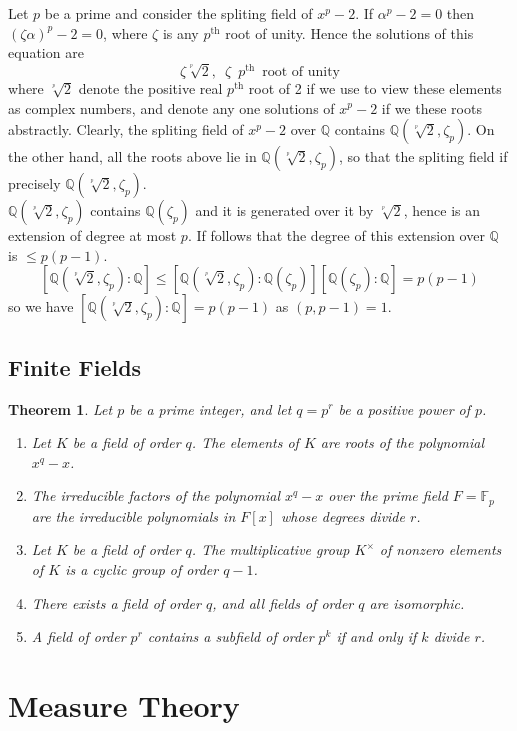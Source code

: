 \documentclass[answers, a4paper, 12pt]{exam}
\newtheorem{theorem}{Theorem}[section]
\newcommand{\Q}{\mathbb{Q}}
\begin{document}
Let $p$ be a prime and consider the spliting field of $x^p-2$. If ${\alpha}^p-2=0$ then $(\zeta\alpha)^p-2=0$, where $\zeta$ is any $p^{\text{th}}$ root of unity. Hence the solutions of this equation are $$\zeta \sqrt[^p]{2},\,\,\,\zeta\,\,\,p^{\text{th}}\,\,\,\text{root of unity}$$
where $\sqrt[^p]{2}$ denote the positive real $p^{\text{th}}$ root of 2 if we use to view these elements as complex numbers, and denote any one solutions of $x^p-2$ if we these roots abstractly. Clearly, the spliting field of $x^p-2$ over $\Q$ contains $\Q(\sqrt[^p]{2},\zeta_p)$. On the other hand, all the roots above lie in $\Q(\sqrt[^p]{2},\zeta_p)$, so that the spliting field if precisely $\Q(\sqrt[^p]{2},\zeta_p)$.\\
$\Q(\sqrt[^p]{2},\zeta_p)$ contains $\Q(\zeta_p)$ and it is generated over it by $\sqrt[^p]{2}$, hence is an extension of degree at most $p$. If follows that the degree of this extension over $\Q$ is $\leq p(p-1)$.
$$[\Q(\sqrt[^p]{2},\zeta_p):\Q]\leq[\Q(\sqrt[^p]{2},\zeta_p):\Q(\zeta_p)][\Q(\zeta_p):\Q]=p(p-1)$$
so we have $[\Q(\sqrt[^p]{2},\zeta_p):\Q]=p(p-1)$ as $(p,p-1)=1$.
\subsection{Finite Fields}
\begin{theorem}
    Let $p$ be a prime integer, and let $q=p^r$ be a positive power of $p$.
    \begin{enumerate}
        \item Let $K$ be a field of order $q$. The elements of $K$ are roots of the polynomial $x^q-x$.
        \item The irreducible factors of the polynomial $x^q-x$ over the prime field $F=\mathbb{F}_p$ are the irreducible polynomials in $F[x]$ whose degrees divide $r$.
        \item Let $K$ be a field of order $q$. The multiplicative group $K^{\times}$ of nonzero elements of $K$ is a cyclic group of order $q-1$.
        \item There exists a field of order $q$, and all fields of order $q$ are isomorphic.
        \item A field of order $p^r$ contains a subfield of order $p^k$ if and only if $k$ divide $r$.
    \end{enumerate}
\end{theorem}

\newpage
\section{Measure Theory}
\end{document}
